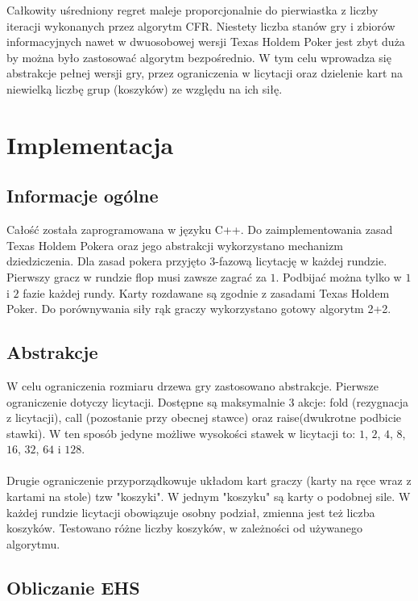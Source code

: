 \documentclass[licencjacka]{pracamgr}
\begin{document}
\noindent
Całkowity uśredniony regret maleje proporcjonalnie do pierwiastka z liczby iteracji wykonanych przez algorytm CFR. Niestety
liczba stanów gry i zbiorów informacyjnych nawet w dwuosobowej wersji Texas Holdem Poker jest zbyt duża by można było
zastosować algorytm bezpośrednio. W tym celu wprowadza się abstrakcje pełnej wersji gry, przez ograniczenia w licytacji
oraz dzielenie kart na niewielką liczbę grup (koszyków) ze względu na ich siłę. \\

\chapter{Implementacja}

\section{Informacje ogólne}

Całość została zaprogramowana w języku C++. Do zaimplementowania zasad Texas Holdem Pokera oraz jego
abstrakcji wykorzystano mechanizm dziedziczenia. Dla zasad pokera przyjęto 3-fazową licytację w każdej
rundzie. Pierwszy gracz w rundzie flop musi zawsze zagrać za $1$. Podbijać można tylko w $1$ i $2$ fazie
każdej rundy. Karty rozdawane są zgodnie z zasadami Texas Holdem Poker. Do porównywania siły rąk graczy
wykorzystano gotowy algorytm 2+2.

\section{Abstrakcje}

W celu ograniczenia rozmiaru drzewa gry zastosowano abstrakcje. Pierwsze ograniczenie dotyczy
licytacji. Dostępne są maksymalnie 3 akcje: fold (rezygnacja z licytacji), call (pozostanie przy obecnej stawce)
oraz raise(dwukrotne podbicie stawki). W ten sposób jedyne możliwe wysokości stawek w licytacji to: $1$, $2$,
$4$, $8$, $16$, $32$, $64$ i $128$. \\\\
\noindent
Drugie ograniczenie przyporządkowuje układom kart graczy (karty na ręce wraz z kartami na stole) tzw "koszyki".
W jednym "koszyku" są karty o podobnej sile. W każdej rundzie licytacji obowiązuje osobny podział, zmienna
jest też liczba koszyków. Testowano różne liczby koszyków, w zależności od używanego algorytmu.

\section{Obliczanie EHS}
\end{document}
